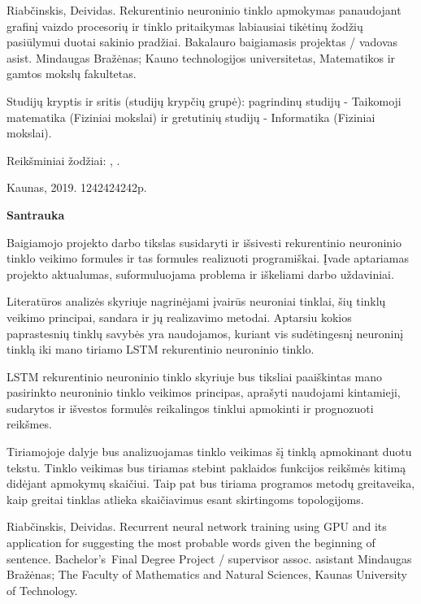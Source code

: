 Riabčinskis, Deividas. Rekurentinio neuroninio tinklo apmokymas panaudojant grafinį vaizdo procesorių ir tinklo pritaikymas labiausiai tikėtinų žodžių pasiūlymui duotai sakinio pradžiai. Bakalauro baigiamasis projektas / vadovas asist. Mindaugas Bražėnas; Kauno technologijos universitetas, Matematikos ir gamtos mokslų fakultetas.

Studijų kryptis ir sritis (studijų krypčių grupė): pagrindinų studijų - Taikomoji matematika (Fiziniai mokslai) ir gretutinių studijų - Informatika (Fiziniai mokslai).

Reikšminiai žodžiai: , .

Kaunas, 2019. 1242424242p.%

\begin{center}
\textbf{Santrauka}
\end{center}

Baigiamojo projekto darbo tikslas susidaryti ir išsivesti rekurentinio neuroninio tinklo vei\-ki\-mo formules ir tas formules realizuoti programiškai. Įvade aptariamas projekto aktualumas, suformuluojama problema ir iškeliami darbo uždaviniai.

Literatūros analizės skyriuje nagrinėjami įvairūs neuroniai tinklai, šių tinklų veikimo principai, sandara ir jų realizavimo metodai. Aptarsiu kokios paprastesnių tinklų savybės yra naudojamos, kuriant vis sudėtingesnį neuroninį tinklą iki mano tiriamo LSTM rekurentinio neuroninio tinklo.

LSTM rekurentinio neuroninio tinklo skyriuje bus tiksliai paaiškintas mano pasirinkto neuroninio tinklo veikimos principas, aprašyti naudojami kintamieji, sudarytos ir išvestos formulės reikalingos tinklui apmokinti ir prognozuoti reikšmes.

Tiriamojoje dalyje bus analizuojamas tinklo veikimas šį tinklą apmokinant duotu tekstu. Tinklo veikimas bus tiriamas stebint paklaidos funkcijos reikšmės kitimą didėjant apmokymų skaičiui. Taip pat bus tiriama programos metodų greitaveika, kaip greitai tinklas atlieka skaičiavimus esant skirtingoms topologijoms.



\clearpage

Riabčinskis, Deividas. Recurrent neural network training using GPU and its application for suggesting the most probable words given the beginning of sentence. Bachelor's Final Degree Project / supervisor assoc. asistant Mindaugas Bražėnas; The Faculty of Mathematics and Natural Sciences, Kaunas University of Technology.

